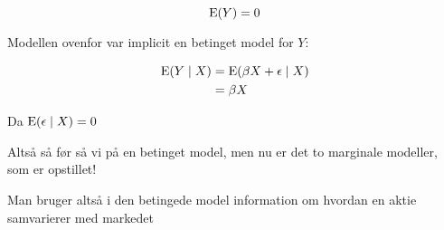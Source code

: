 \begin{equation}
    \text{E}(Y) = 0
\end{equation}

Modellen ovenfor var implicit en betinget model for $Y$:

\begin{align}
    \text{E}(Y \mid X) &= \text{E}( \beta X + \epsilon \mid X) \\
    &= \beta X
\end{align}

Da $\text{E}(\epsilon \mid X) = 0$

Altså så før så vi på en betinget model, men nu er det to marginale modeller, som er opstillet!

Man bruger altså i den betingede model information om hvordan en aktie samvarierer med markedet

